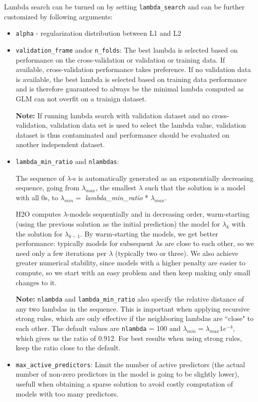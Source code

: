 Lambda search can be turned on by setting \texttt{lambda\_search} and can be further customized by following arguments:

\begin{itemize}
\item \texttt{alpha} - regularization distribution between L1 and L2
\item \texttt{validation\_frame} and\/or \texttt{n\_folds}:
The best lambda is selected based on performance on the cross-validation or validation or training data. If available, cross-validation performance takes preference. If no validation data is available, the best lambda is selected based on training data performance and is therefore guaranteed to always be the minimal lambda computed as GLM can not overfit on a trainign dataset.
 
\textbf{Note:} If running lambda search with validation dataset and no cross-validation, validation data set is used to select the lambda value, validation dataset is thus contaminated and performance should be evaluated on another independent dataset.


\item \texttt{lambda\_min\_ratio} and \texttt{nlambdas}: 

The sequence of $\lambda$-s is automatically generated as an exponentially decreasing sequence, going from $\lambda_{max}$,
the smallest $\lambda$ such that the solution is a model with all 0s, to $\lambda_{min} =
$ \textit{lambda\_min\_ratio} * $ \lambda_{max}$.

H2O computes $\lambda$-models sequentially and in decreasing order, warm-starting (using the previous solution as
the initial prediction) the model for $\lambda_k$ with the solution for $\lambda_{k-1}$. By warm-starting the
models, we get better performance: typically models for subsequent $\lambda$s are close to each other, so we need
only a few iterations per $\lambda$ (typically two or three). We also achieve greater numerical stability, since models
with a higher penalty are easier to compute, so we start with an easy problem and then keep making only small
changes to it.


\textbf{Note:} \texttt{nlambda} and \texttt{lambda\_min\_ratio} also specify the relative distance of any two
 lambdas in the sequence. This is important when applying recursive strong rules, which are only effective if the
neighboring lambdas are ``close" to each other. The default values are \texttt{nlambda} = 100 and $\lambda_{min}
= \lambda_{max} 1e^{-4}$, which gives us the ratio of 0.912.  For best results when using strong rules, keep the
ratio close to the default.

\item \texttt{max\_active\_predictors}: Limit the number of active predictors (the actual number of non-zero predictors in the model is going to be slightly lower), usefull when obtaining a sparse solution to avoid costly computation of models with too many predictors.

\end{itemize}


